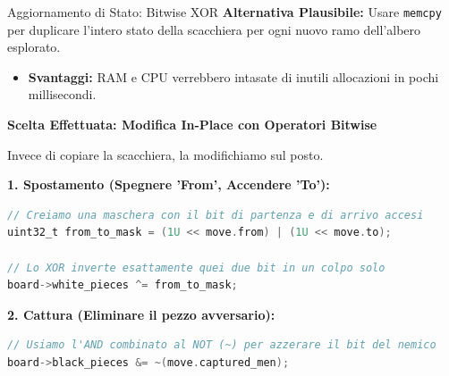 \documentclass[10pt]{beamer}
\begin{document}
\begin{frame}[fragile]{Aggiornamento di Stato: Bitwise XOR}
    \textbf{Alternativa Plausibile:} Usare \texttt{memcpy} per duplicare l'intero stato della scacchiera per ogni nuovo ramo dell'albero esplorato.
    \begin{itemize}
        \item \textbf{Svantaggi:} RAM e CPU verrebbero intasate di inutili allocazioni in pochi millisecondi.
    \end{itemize}
    
    \vspace{0.1cm}
    \textbf{Scelta Effettuata: Modifica In-Place con Operatori Bitwise}
    
    Invece di copiare la scacchiera, la modifichiamo sul posto.

    \vspace{0.1cm}
    
    \textbf{1. Spostamento (Spegnere 'From', Accendere 'To'):}
\begin{lstlisting}[language=C, basicstyle=\ttfamily\footnotesize, keywordstyle=\color{blue}]
// Creiamo una maschera con il bit di partenza e di arrivo accesi
uint32_t from_to_mask = (1U << move.from) | (1U << move.to);

// Lo XOR inverte esattamente quei due bit in un colpo solo
board->white_pieces ^= from_to_mask; 
\end{lstlisting}

    \textbf{2. Cattura (Eliminare il pezzo avversario):}
\begin{lstlisting}[language=C, basicstyle=\ttfamily\footnotesize, keywordstyle=\color{blue}]
// Usiamo l'AND combinato al NOT (~) per azzerare il bit del nemico
board->black_pieces &= ~(move.captured_men);
\end{lstlisting}
\end{frame}
\end{document}
